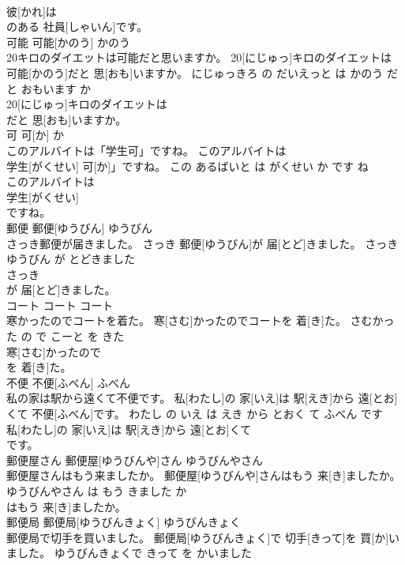 \documentclass[8pt]{extreport}
\begin{document}
\begin{CJK}{UTF8}{min}
\\	彼[かれ]は
\\	のある 社員[しゃいん]です。		
\\	可能	可能[かのう]	かのう	
\\	20キロのダイエットは可能だと思いますか。	20[にじゅっ]キロのダイエットは 可能[かのう]だと 思[おも]いますか。	にじゅっきろ の だいえっと は かのう だ と おもいます か	
\\	20[にじゅっ]キロのダイエットは
\\	だと 思[おも]いますか。		
\\	可	可[か]	か	
\\	このアルバイトは「学生可」ですね。	このアルバイトは
\\	学生[がくせい] 可[か]」ですね。	この あるばいと は がくせい か です ね	
\\	このアルバイトは
\\	学生[がくせい]
\\	ですね。		
\\	郵便	郵便[ゆうびん]	ゆうびん	
\\	さっき郵便が届きました。	さっき 郵便[ゆうびん]が 届[とど]きました。	さっき ゆうびん が とどきました	
\\	さっき
\\	が 届[とど]きました。		
\\	コート	コート	コート	
\\	寒かったのでコートを着た。	寒[さむ]かったのでコートを 着[き]た。	さむかった の で こーと を きた	
\\	寒[さむ]かったので
\\	を 着[き]た。		
\\	不便	不便[ふべん]	ふべん	
\\	私の家は駅から遠くて不便です。	私[わたし]の 家[いえ]は 駅[えき]から 遠[とお]くて 不便[ふべん]です。	わたし の いえ は えき から とおく て ふべん です	
\\	私[わたし]の 家[いえ]は 駅[えき]から 遠[とお]くて
\\	です。		
\\	郵便屋さん	郵便屋[ゆうびんや]さん	ゆうびんやさん	
\\	郵便屋さんはもう来ましたか。	郵便屋[ゆうびんや]さんはもう 来[き]ましたか。	ゆうびんやさん は もう きました か	
\\	はもう 来[き]ましたか。		
\\	郵便局	郵便局[ゆうびんきょく]	ゆうびんきょく	
\\	郵便局で切手を買いました。	郵便局[ゆうびんきょく]で 切手[きって]を 買[か]いました。	ゆうびんきょくで きって を かいました	

\end{CJK}
\end{document}
